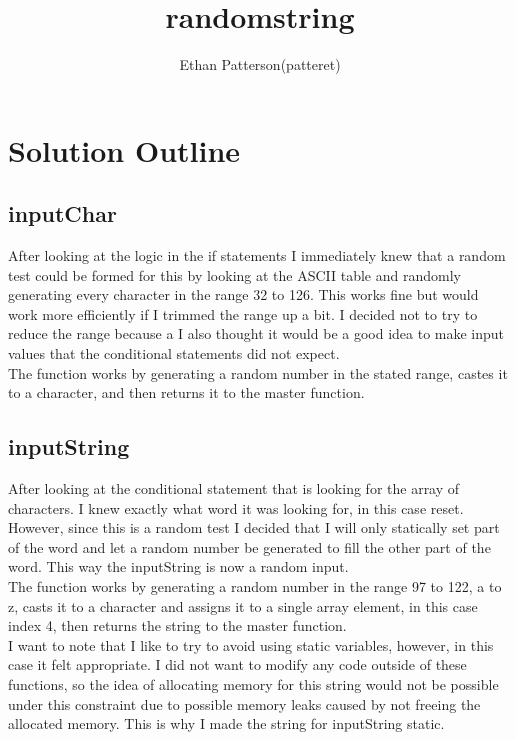 \documentclass[a4paper]{article}
\title{randomstring}
\author{Ethan Patterson(patteret)}
\begin{document}
\maketitle
\pagebreak
\tableofcontents
\pagebreak
\section{Solution Outline}
\subsection{inputChar}
After looking at the logic in the if statements I immediately knew that a random test could be formed for this by looking at the ASCII table and randomly generating every character in the range 32 to 126. This works fine but would work more efficiently if I trimmed the range up a bit. I decided not to try to reduce the range because a I also thought it would be a good idea to make input values that the conditional statements did not expect.
\\[2mm]
The function works by generating a random number in the stated range, castes it to a character, and then returns it to the master function.
\\[5mm]
\subsection{inputString}
After looking at the conditional statement that is looking for the array of characters. I knew exactly what word it was looking for, in this case reset. However, since this is a random test I decided that I will only statically set part of the word and let a random number be generated to fill the other part of the word. This way the inputString is now a random input.
\\[2mm]
The function works by generating a random number in the range 97 to 122, a to z, casts it to a character and assigns it to a single array element, in this case index 4, then returns the string to the master function.
\\[2mm]
I want to note that I like to try to avoid using static variables, however, in this case it felt appropriate. I did not want to modify any code outside of these functions, so the idea of allocating memory for this string would not be possible under this constraint due to possible memory leaks caused by not freeing the allocated memory. This is why I made the string for inputString static.
\end{document}
